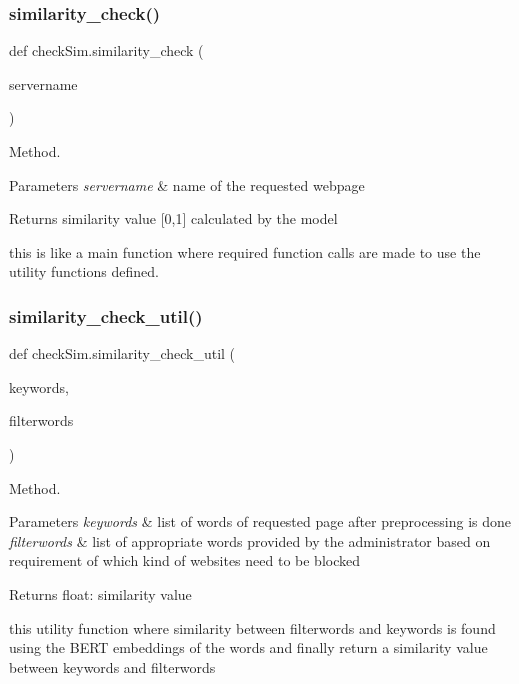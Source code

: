 \subsubsection{\texorpdfstring{similarity\+\_\+check()}{similarity\_check()}}
{\footnotesize\ttfamily def check\+Sim.\+similarity\+\_\+check (\begin{DoxyParamCaption}\item[{}]{servername }\end{DoxyParamCaption})}



Method. 


\begin{DoxyParams}{Parameters}
{\em servername} & name of the requested webpage \\
\hline
\end{DoxyParams}
\begin{DoxyReturn}{Returns}
similarity value \mbox{[}0,1\mbox{]} calculated by the model
\end{DoxyReturn}
this is like a main function where required function calls are made to use the utility functions defined. \mbox{\label{namespacecheckSim_aca742c80c5db1f197a41e26f60539cec}} 
\subsubsection{\texorpdfstring{similarity\+\_\+check\+\_\+util()}{similarity\_check\_util()}}
{\footnotesize\ttfamily def check\+Sim.\+similarity\+\_\+check\+\_\+util (\begin{DoxyParamCaption}\item[{}]{keywords,  }\item[{}]{filterwords }\end{DoxyParamCaption})}



Method. 


\begin{DoxyParams}{Parameters}
{\em keywords} & list of words of requested page after preprocessing is done \\
\hline
{\em filterwords} & list of appropriate words provided by the administrator based on requirement of which kind of websites need to be blocked \\
\hline
\end{DoxyParams}
\begin{DoxyReturn}{Returns}
float\+: similarity value
\end{DoxyReturn}
this utility function where similarity between filterwords and keywords is found using the B\+E\+RT embeddings of the words and finally return a similarity value between keywords and filterwords 